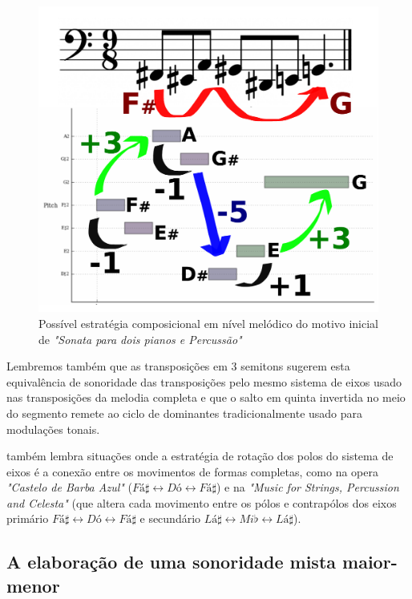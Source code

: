 \documentclass[
	12pt,				%
	openright,			%
	twoside,			%
	a4paper,			%
	english,			%
	french,				%
	spanish,			%
	brazil				%
	]{abntex2}
\begin{document}
\begin{figure}[!h]
	\caption{\label{fig_grafico}Possível estratégia composicional em nível melódico do motivo inicial de \textit{"Sonata para dois pianos e Percussão"}}
	\begin{center}
	    \includegraphics[scale=0.4]{axis/temasonata2P.pdf}
	\end{center}
\end{figure}


Lembremos também que as transposições em 3 semitons sugerem esta equivalência de sonoridade das transposições pelo mesmo sistema de eixos usado nas transposições da melodia completa e que o salto em quinta invertida no meio do segmento remete ao ciclo de dominantes tradicionalmente usado para modulações tonais.


 também lembra situações onde a estratégia de rotação dos polos do sistema de eixos é a conexão entre os movimentos de formas completas, como na opera \textit{"Castelo de Barba Azul"} ($Fá\sharp \leftrightarrow  Dó \leftrightarrow Fá\sharp$) e na \textit{"Music for Strings, Percussion and Celesta" } (que altera cada movimento entre os pólos e contrapólos dos eixos primário $Fá\sharp \leftrightarrow  Dó \leftrightarrow Fá\sharp$ e secundário $Lá\sharp \leftrightarrow  Mi\flat \leftrightarrow Lá\sharp$).


\subsection{A elaboração de uma sonoridade mista maior-menor}
\label{lendvai_maior_menor}
\end{document}
